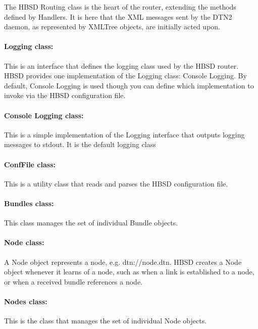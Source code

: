 The HBSD Routing class is the heart of the router, extending the methods
defined by Handlers. It is here that the XML messages sent by the DTN2 daemon,
as represented by XMLTree objects, are initially acted upon.

\paragraph{Logging class:}

This is an interface that defines the logging class used by the HBSD router.
HBSD provides one implementation of the Logging class: Console Logging. By
default, Console Logging is used though you can define which implementation to
invoke via the HBSD configuration file.

\paragraph{Console Logging class:}

This is a simple implementation of the Logging interface that outputs logging
messages to stdout. It is the default logging class

\paragraph{ConfFile class:}

This is a utility class that reads and parses the HBSD configuration file.

\paragraph{Bundles class:}

This class manages the set of individual Bundle objects.

\paragraph{Node class:}

A Node object represents a node, e.g. dtn://node.dtn. HBSD creates a Node
object whenever it learns of a node, such as when a link is established to a
node, or when a received bundle references a node.

\paragraph{Nodes class:}
This is the class that manages the set of individual Node objects.

